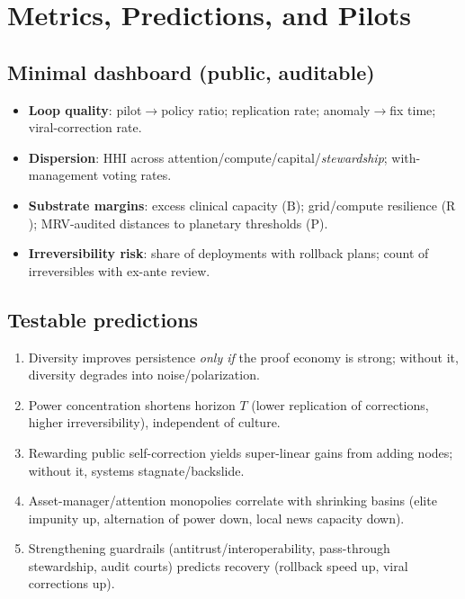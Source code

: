 \documentclass[11pt,a4paper]{article}
\newcommand{\B}{\mathrm{B}} %
\newcommand{\R}{\mathrm{R}} %
\newcommand{\Pplanet}{\mathrm{P}} %
\begin{document}
\section{Metrics, Predictions, and Pilots}
\label{sec:metrics}

\subsection*{Minimal dashboard (public, auditable)}
\begin{itemize}[leftmargin=1.2em]
\item \textbf{Loop quality}: pilot$\to$policy ratio; replication rate; anomaly$\to$fix time; viral-correction rate.
\item \textbf{Dispersion}: HHI across attention/compute/capital/\emph{stewardship}; with-management voting rates.
\item \textbf{Substrate margins}: excess clinical capacity ($\B$); grid/compute resilience ($\R$); MRV-audited distances to planetary thresholds ($\Pplanet$).
\item \textbf{Irreversibility risk}: share of deployments with rollback plans; count of irreversibles with ex-ante review.
\end{itemize}

\subsection*{Testable predictions}
\begin{enumerate}[leftmargin=1.2em]
\item Diversity improves persistence \emph{only if} the proof economy is strong; without it, diversity degrades into noise/polarization.
\item Power concentration shortens horizon $T$ (lower replication of corrections, higher irreversibility), independent of culture.
\item Rewarding public self-correction yields super-linear gains from adding nodes; without it, systems stagnate/backslide.
\item Asset-manager/attention monopolies correlate with shrinking basins (elite impunity up, alternation of power down, local news capacity down).
\item Strengthening guardrails (antitrust/interoperability, pass-through stewardship, audit courts) predicts recovery (rollback speed up, viral corrections up).
\end{enumerate}
\end{document}
